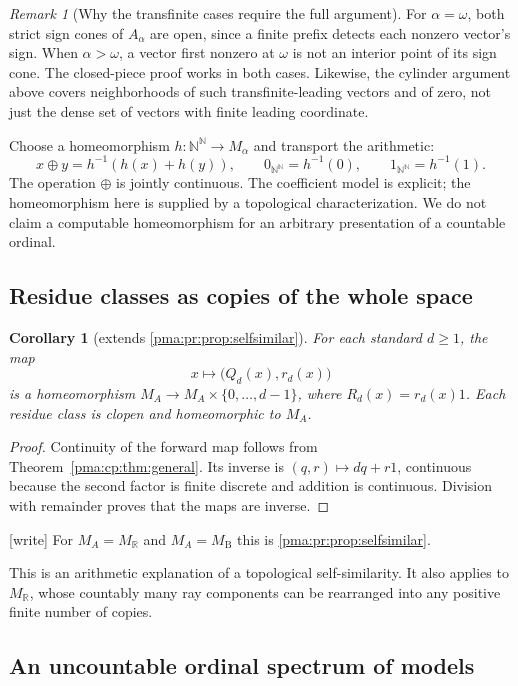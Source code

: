 \documentclass[11pt]{article}
\numberwithin{equation}{section}
\newtheorem{corollary}[corollary]{Corollary}
\theoremstyle{definition}
\theoremstyle{remark}
\newtheorem{remark}[remark]{Remark}
\newcommand{\N}{\mathbb N}
\newcommand{\R}{\mathbb R}
\newcommand{\Baire}{\N^{\N}}
\newcommand{\MR}{M_{\R}}
\newcommand{\MB}{M_{\mathrm B}}
\newcommand{\writetag}{\textup{\textsf{\small[write]}}}
\begin{document}
\begin{remark}[Why the transfinite cases require the full argument]
For $\alpha=\omega$, both strict sign cones of $A_\alpha$ are open,
since a finite prefix detects each nonzero vector's sign. When
$\alpha>\omega$, a vector first nonzero at $\omega$ is not an interior
point of its sign cone. The closed-piece proof works in both cases.
Likewise, the cylinder argument above covers neighborhoods of such
transfinite-leading vectors and of zero, not just the dense set of vectors
with finite leading coordinate.
\end{remark}

Choose a homeomorphism $h:\Baire\to M_\alpha$ and transport the
arithmetic:
\[
x\oplus y=h^{-1}(h(x)+h(y)),\qquad
0_{\Baire}=h^{-1}(0),\qquad 1_{\Baire}=h^{-1}(1).
\]
The operation $\oplus$ is jointly continuous. The coefficient model is
explicit; the homeomorphism here is supplied by a topological
characterization. We do not claim a computable homeomorphism for an
arbitrary presentation of a countable ordinal.

\subsection{Residue classes as copies of the whole space}

\begin{corollary}[extends \cref{pma:pr:prop:selfsimilar}]
\label{pma:cp:cor:residuehomeo}
For each standard $d\geq1$, the map
\[
x\longmapsto\bigl(Q_d(x),r_d(x)\bigr)
\]
is a homeomorphism $M_A\to M_A\times\{0,\ldots,d-1\}$, where
$R_d(x)=r_d(x)1$. Each residue class is clopen and homeomorphic to $M_A$.
\end{corollary}

\begin{proof}
Continuity of the forward map follows from
Theorem~\ref{pma:cp:thm:general}. Its inverse is
$(q,r)\mapsto dq+r1$, continuous because the second factor is finite
discrete and addition is continuous. Division with remainder proves that
the maps are inverse.
\end{proof}

\noindent\writetag{} For $M_A=\MR$ and $M_A=\MB$ this is
\cref{pma:pr:prop:selfsimilar}.

This is an arithmetic explanation of a topological self-similarity.
It also applies to $M_{\R}$, whose countably many ray components can be
rearranged into any positive finite number of copies.

\subsection{An uncountable ordinal spectrum of models}
\end{document}
